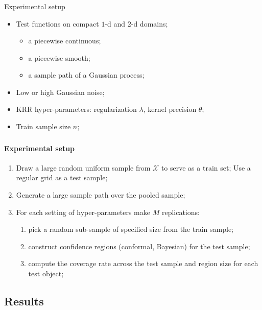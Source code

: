 \documentclass[t]{beamer}  %
\newcommand{\Xcal}{\mathcal{X}}
\begin{document}
\begin{frame}[t]\frametitle{\insertsection}
  \begin{block}{Experimental setup}
  \end{block}
  \begin{itemize}
    \item Test functions on compact $1$-d and $2$-d domains; \begin{itemize}
      \item a piecewise continuous;
      \item a piecewise smooth;
      \item a sample path of a Gaussian process;
    \end{itemize}
    \vspace{\baselineskip}
    \item Low or high Gaussian noise;
    \item KRR hyper-parameters: regularization $\lambda$, kernel precision $\theta$;
    \item Train sample size $n$;
  \end{itemize}
\end{frame}

\begin{frame}[c]\frametitle{\insertsection}
  \framesubtitle{Experimental setup}
  \begin{enumerate}
    \item Draw a large random uniform sample from $\Xcal$ to serve as a train set;
      Use a regular grid as a test sample;
    \item Generate a large sample path over the pooled sample;
    \item For each setting of hyper-parameters make $M$ replications: \begin{enumerate}
      \item pick a random sub-sample of specified size from the train sample;
      \item construct confidence regions (conformal, Bayesian) for the test sample;
      \item compute the coverage rate across the test sample and region size for each test object;
    \end{enumerate}
  \end{enumerate}
\end{frame}

\subsection{Results} %
\label{sub:results}
\end{document}
